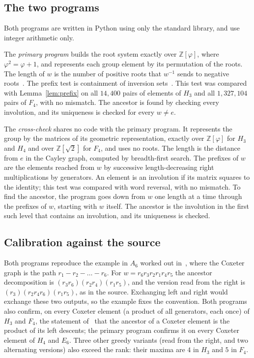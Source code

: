 \documentclass[11pt]{amsart}
\theoremstyle{definition}\newtheorem{definition}[theorem]{Definition}
\theoremstyle{remark}\newtheorem{remark}[theorem]{Remark}
\newcommand{\Z}{\mathbb{Z}}
\begin{document}
\subsection{The two programs}
Both programs are written in Python using only the standard library, and use integer arithmetic only.

The \emph{primary program}  builds the root system exactly over \(\Z[\varphi]\), where \(\varphi^2=\varphi+1\), and represents each group element by its permutation of the roots. The length of \(w\) is the number of positive roots that \(w^{-1}\) sends to negative roots~\cite[\S5.6]{Hum}. The prefix test is containment of inversion sets~\cite[Prop.~3.1.3]{BB}. This test was compared with Lemma~\ref{lem:prefix} on all \(14{,}400\) pairs of elements of \(H_3\) and all \(1{,}327{,}104\) pairs of \(F_4\), with no mismatch. The ancestor is found by checking every involution, and its uniqueness is checked for every \(w\neq e\).

The \emph{cross-check}  shares no code with the primary program. It represents the group by the matrices of its geometric representation, exactly over \(\Z[\varphi]\) for \(H_3\) and \(H_4\) and over \(\Z[\sqrt2]\) for \(F_4\), and uses no roots. The length is the distance from \(e\) in the Cayley graph, computed by breadth-first search. The prefixes of \(w\) are the elements reached from \(w\) by successive length-decreasing right multiplications by generators. An element is an involution if its matrix squares to the identity; this test was compared with word reversal, with no mismatch. To find the ancestor, the program goes down from \(w\) one length at a time through the prefixes of \(w\), starting with \(w\) itself. The ancestor is the involution in the first such level that contains an involution, and its uniqueness is checked.

\subsection{Calibration against the source}
Both programs reproduce the example in \(A_6\) worked out in~\cite[\S3]{HR}, where the Coxeter graph is the path \(r_1-r_2-\dots-r_6\). For \(w=r_6r_3r_2r_1r_4r_5\) the ancestor decomposition is \((r_3r_6)(r_2r_4)(r_1r_5)\), and the version read from the right is \((r_3)(r_2r_4r_6)(r_1r_5)\), as in the source. Exchanging left and right would exchange these two outputs, so the example fixes the convention. Both programs also confirm, on every Coxeter element (a product of all generators, each once) of \(H_3\) and \(F_4\), the statement of~\cite{HR} that the ancestor of a Coxeter element is the product of its left descents; the primary program confirms it on every Coxeter element of \(H_4\) and \(E_6\). Three other greedy variants (read from the right, and two alternating versions) also exceed the rank: their maxima are \(4\) in \(H_3\) and \(5\) in \(F_4\).
\end{document}
